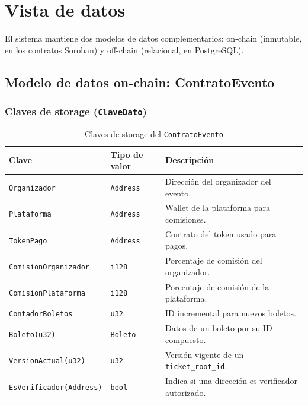 \documentclass[12pt,oneside]{article}
\begin{document}
\FloatBarrier
\clearpage
\section{Vista de datos}
\label{sec:vista-datos}

El sistema mantiene dos modelos de datos complementarios: on-chain (inmutable, en los contratos Soroban) y off-chain (relacional, en PostgreSQL).

\subsection{Modelo de datos on-chain: ContratoEvento}

\subsubsection{Claves de storage (\texttt{ClaveDato})}

\begin{table}[htbp]
\centering
\caption{Claves de storage del \texttt{ContratoEvento}}
\begin{tabularx}{\textwidth}{l l X}
\toprule
\textbf{Clave} & \textbf{Tipo de valor} & \textbf{Descripción} \\
\midrule
\texttt{Organizador} & \texttt{Address} & Dirección del organizador del evento. \\
\texttt{Plataforma} & \texttt{Address} & Wallet de la plataforma para comisiones. \\
\texttt{TokenPago} & \texttt{Address} & Contrato del token usado para pagos. \\
\texttt{ComisionOrganizador} & \texttt{i128} & Porcentaje de comisión del organizador. \\
\texttt{ComisionPlataforma} & \texttt{i128} & Porcentaje de comisión de la plataforma. \\
\texttt{ContadorBoletos} & \texttt{u32} & ID incremental para nuevos boletos. \\
\texttt{Boleto(u32)} & \texttt{Boleto} & Datos de un boleto por su ID compuesto. \\
\texttt{VersionActual(u32)} & \texttt{u32} & Versión vigente de un \texttt{ticket\_root\_id}. \\
\texttt{EsVerificador(Address)} & \texttt{bool} & Indica si una dirección es verificador autorizado. \\
\bottomrule
\end{tabularx}
\end{table}
\end{document}
